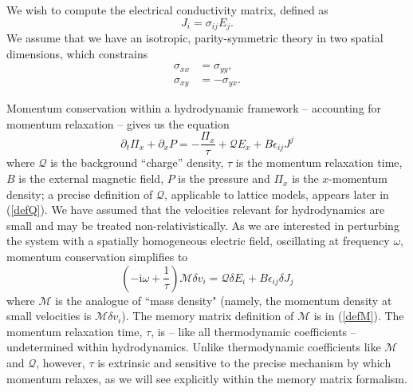 \documentclass[10pt, oneside]{book}
\begin{document}
\begin{doublespace}
We wish to compute the electrical conductivity matrix, defined as \begin{equation}
J_i = \sigma_{ij}E_j.
\end{equation}We assume that we have an isotropic, parity-symmetric theory in two spatial dimensions, which constrains\begin{subequations}\begin{align}
\sigma_{xx} &= \sigma_{yy}, \\
\sigma_{xy} &= -\sigma_{yx}.
\end{align}\end{subequations}

Momentum conservation within a hydrodynamic framework -- accounting for momentum relaxation -- gives us the equation \begin{equation}
\partial_t \Pi_x + \partial_x P = -\frac{\Pi_x}{\tau} + \mathcal{Q}E_x + B\epsilon_{ij}J^j
\end{equation} 
where $\mathcal{Q}$ is the background ``charge'' density, $\tau$ is the momentum relaxation time, $B$ is the external magnetic field, $P$ is the pressure and $\Pi_x$ is the $x$-momentum density; a precise definition of $\mathcal{Q}$, applicable to lattice models, appears later in (\ref{defQ}). 
We have assumed that the velocities relevant for hydrodynamics are small and may be treated non-relativistically.   As we are interested in perturbing the system with a spatially homogeneous electric field, oscillating at frequency $\omega$, momentum conservation simplifies to \begin{equation}
\left(-\mathrm{i}\omega + \frac{1}{\tau}\right)\mathcal{M}\delta v_i = \mathcal{Q} \delta E_i + B \epsilon_{ij} \delta J_j   \label{eqv}
\end{equation}where $\mathcal{M}$ is the analogue of ``mass density" (namely, the momentum density at small velocities is $\mathcal{M}\delta v_i$).    The memory matrix definition of $\mathcal{M}$ is in (\ref{defM}).
 The momentum relaxation time, $\tau$, is -- like all thermodynamic coefficients -- undetermined within hydrodynamics.   Unlike thermodynamic coefficients like $\mathcal{M}$ and $\mathcal{Q}$, however, $\tau$ is extrinsic and sensitive to the precise mechanism by which momentum relaxes, as we will see explicitly within the memory matrix formalism.


\end{doublespace}
\end{document}
